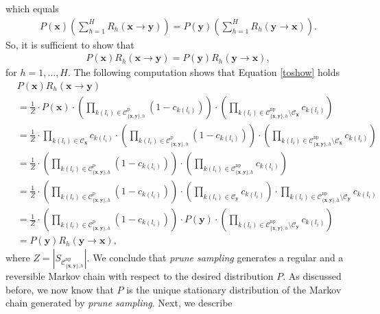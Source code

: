 \documentclass[a4paper, twoside, 11pt]{report}
\newcommand{\bfx}{{\mathbf{x}}}
\newcommand{\C}{{\mathcal C}}
\theoremstyle{plain}
\theoremstyle{definition}
\theoremstyle{remark}
\newcommand{\ps}{\textit{prune sampling }}
\newcommand{\bfy}{{\mathbf{y}}}
\begin{document}
which equals
\begin{align*}
P(\mathbf{x}) \left(\sum_{h=1}^{H} {R}_h (\mathbf{x} \to \mathbf{y}) \right) = P(\mathbf{y}) \left(\sum_{h=1}^{H} {R}_h (\mathbf{y} \to \mathbf{x}) \right).
\end{align*}
So, it is sufficient to show that
\begin{align} \label{toshow}
P(\mathbf{x}) {R}_h (\mathbf{x} \to \mathbf{y}) = P(\mathbf{y})  {R}_h (\mathbf{y} \to \mathbf{x}), 
\end{align}
for $h = 1, \ldots, H$. The following computation shows that Equation \eqref{toshow} holds
\begin{align*}
&P(\mathbf{x}) {R}_h (\mathbf{x} \to \mathbf{y}) \\
&= \frac{1}{Z} \cdot P(\mathbf{x}) \cdot \left(\prod_{k(l_i) \in \C_{\{\bfx, \bfy\},h}^{\text{p}} } (1-c_{k(l_i)}) \right)\cdot \left( \prod_{k(l_i) \in \C_{\{\bfx, \bfy\},h}^{\text{np}}  \setminus \mathcal{C}_{\mathbf{x}} } c_{k(l_i)} \right) \\ 
&= \frac{1}{Z} \cdot \prod_{k(l_i) \in \mathcal{C}_{\mathbf{x}}} c_{k(l_i)} \cdot \left(\prod_{k(l_i) \in \C_{\{\bfx, \bfy\},h}^{\text{p}} } (1-c_{k(l_i)}) \right)\cdot \left( \prod_{k(l_i) \in \C_{\{\bfx, \bfy\},h}^{\text{np}} \setminus \mathcal{C}_{\mathbf{x}} } c_{k(l_i)} \right) \\ 
&= \frac{1}{Z} \cdot \left(\prod_{k(l_i) \in \C_{\{\bfx, \bfy\},h}^{\text{p}}} (1-c_{k(l_i)}) \right)\cdot \left( \prod_{k(l_i) \in \C_{\{\bfx, \bfy\},h}^{\text{np}}   } c_{k(l_i)}   \right) \\ 
&= \frac{1}{Z} \cdot \left(\prod_{k(l_i) \in \C_{\{\bfx, \bfy\},h}^{\text{p}}} (1-c_{k(l_i)}) \right)\cdot \left( \prod_{k(l_i) \in \mathcal{C}_{\mathbf{y}}} c_{k(l_i)}   \right) \cdot  \prod_{k(l_i) \in \C_{\{\bfx, \bfy\},h}^{\text{np}} \setminus \mathcal{C}_{\mathbf{y}}  } c_{k(l_i)} \\ 
&= \frac{1}{Z} \cdot \left(\prod_{k(l_i) \in \C_{\{\bfx, \bfy\},h}^{\text{p}} } (1-c_{k(l_i)}) \right)\cdot P(\mathbf{y}) \cdot\left( \prod_{k(l_i) \in \C_{\{\bfx, \bfy\},h}^{\text{np}}  \setminus \mathcal{C}_{\mathbf{y}}  } c_{k(l_i)}   \right) \\ 
&= P(\mathbf{y}) {R}_h (\mathbf{y} \to \mathbf{x}),
\end{align*}
\noindent where $Z = |S_{\C_{\{\bfx, \bfy\},h}^{\text{np}} }|$. We conclude that \ps generates a regular and a reversible Markov chain with respect to the desired distribution $P$. As discussed before, we now know that $P$ is the unique stationary distribution of the Markov chain generated by \textit{prune sampling}. Next, we describe
\end{document}
